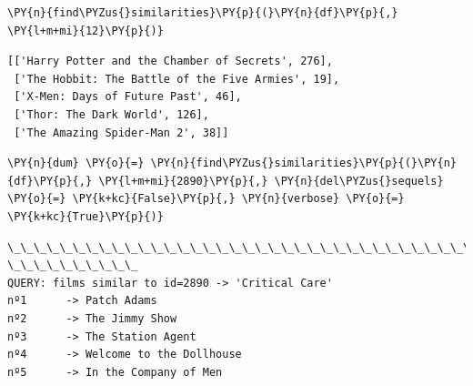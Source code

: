     \begin{tcolorbox}[breakable, size=fbox, boxrule=1pt, pad at break*=1mm,colback=cellbackground, colframe=cellborder]
\begin{Verbatim}[commandchars=\\\{\}]
\PY{n}{find\PYZus{}similarities}\PY{p}{(}\PY{n}{df}\PY{p}{,} \PY{l+m+mi}{12}\PY{p}{)}
\end{Verbatim}
\end{tcolorbox}

            \begin{tcolorbox}[breakable, boxrule=.5pt, size=fbox, pad at break*=1mm, opacityfill=0]
\begin{Verbatim}[commandchars=\\\{\}]
[['Harry Potter and the Chamber of Secrets', 276],
 ['The Hobbit: The Battle of the Five Armies', 19],
 ['X-Men: Days of Future Past', 46],
 ['Thor: The Dark World', 126],
 ['The Amazing Spider-Man 2', 38]]
\end{Verbatim}
\end{tcolorbox}
        
    \begin{tcolorbox}[breakable, size=fbox, boxrule=1pt, pad at break*=1mm,colback=cellbackground, colframe=cellborder]
\begin{Verbatim}[commandchars=\\\{\}]
\PY{n}{dum} \PY{o}{=} \PY{n}{find\PYZus{}similarities}\PY{p}{(}\PY{n}{df}\PY{p}{,} \PY{l+m+mi}{2890}\PY{p}{,} \PY{n}{del\PYZus{}sequels} \PY{o}{=} \PY{k+kc}{False}\PY{p}{,} \PY{n}{verbose} \PY{o}{=} \PY{k+kc}{True}\PY{p}{)}
\end{Verbatim}
\end{tcolorbox}

    \begin{Verbatim}[commandchars=\\\{\}]
\_\_\_\_\_\_\_\_\_\_\_\_\_\_\_\_\_\_\_\_\_\_\_\_\_\_\_\_\_\_\_\_\_\_\_\_\_\_\_\_\_\_\_\_\_\_\_\_\_\_\_\_\_\_\_\_\_\_\_\_\_\_\_\_\_\_\_\_\_\_\_\_\_\_\_\_\_\_\_\_
\_\_\_\_\_\_\_\_\_\_
QUERY: films similar to id=2890 -> 'Critical Care'
nº1      -> Patch Adams
nº2      -> The Jimmy Show
nº3      -> The Station Agent
nº4      -> Welcome to the Dollhouse
nº5      -> In the Company of Men
\end{Verbatim}

